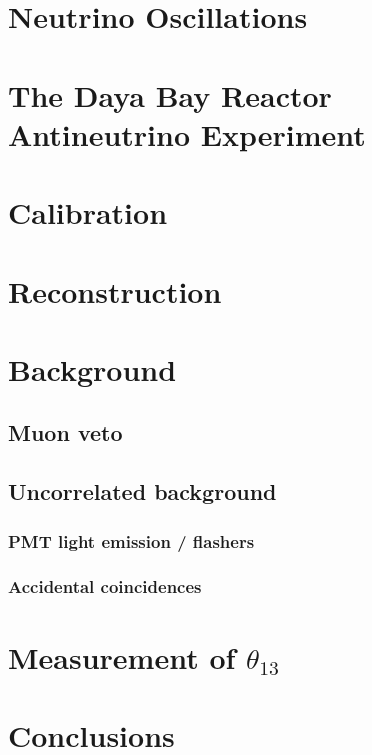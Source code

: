 \documentclass{ucbthesis}
\newcommand{\thetaot}{\ensuremath{\theta_{13}}}
\begin{document}
\chapter{Neutrino Oscillations}

\chapter{The Daya Bay Reactor Antineutrino Experiment}

\chapter{Calibration}

\chapter{Reconstruction}



\chapter{Background}
\label{ch:background}

\section{Muon veto}
\label{sec:muonveto}

\section{Uncorrelated background}

\subsection{PMT light emission / flashers}
\label{subsec:flashers}

\subsection{Accidental coincidences}
\label{subsec:acc}

\chapter{Measurement of \texorpdfstring{$\thetaot$}{theta13}}

\chapter{Conclusions}

\appendix


\end{document}
